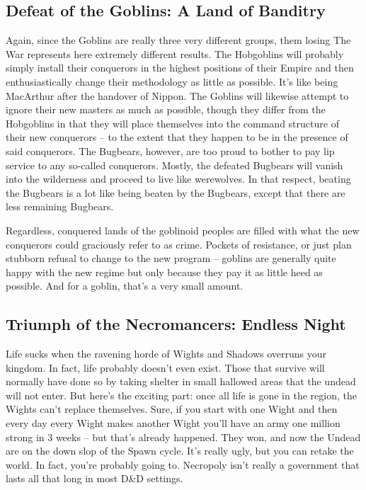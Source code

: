 \subsection{Defeat of the Goblins: A Land of Banditry}

Again, since the Goblins are really three very different groups, them losing The War represents here extremely different results. The Hobgoblins will probably simply install their conquerors in the highest positions of their Empire and then enthusiastically change their methodology as little as possible. It's like being MacArthur after the handover of Nippon. The Goblins will likewise attempt to ignore their new masters as much as possible, though they differ from the Hobgoblins in that they will place themselves into the command structure of their new conquerors -- to the extent that they happen to be in the presence of said conquerors. The Bugbears, however, are too proud to bother to pay lip service to any so-called conquerors. Mostly, the defeated Bugbears will vanish into the wilderness and proceed to live like werewolves. In that respect, beating the Bugbears is a lot like being beaten by the Bugbears, except that there are less remaining Bugbears.

Regardless, conquered lands of the goblinoid peoples are filled with what the new conquerors could graciously refer to as crime. Pockets of resistance, or just plan stubborn refusal to change to the new program -- goblins are generally quite happy with the new regime but only because they pay it as little heed as possible. And for a goblin, that's a very small amount.

\subsection{Triumph of the Necromancers: Endless Night}

Life sucks when the ravening horde of Wights and Shadows overruns your kingdom. In fact, life probably doesn't even exist. Those that survive will normally have done so by taking shelter in small hallowed areas that the undead will not enter. But here's the exciting part: once all life is gone in the region, the Wights can't replace themselves. Sure, if you start with one Wight and then every day every Wight makes another Wight you'll have an army one million strong in 3 weeks -- but that's already happened. They won, and now the Undead are on the down slop of the Spawn cycle. It's really ugly, but you can retake the world. In fact, you're probably going to. Necropoly isn't really a government that lasts all that long in most D\&D settings.

